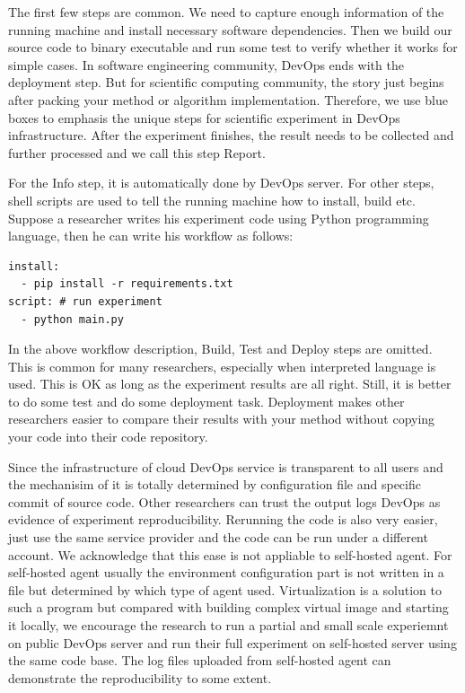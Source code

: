 \documentclass{IEEEcsmag}
\begin{document}
The first few steps are common. We need to capture enough information of the running machine and install necessary software dependencies. Then we build our source code to binary executable and run some test to verify whether it works for simple cases. In software engineering community, DevOps ends with the deployment step. But for scientific computing community, the story just begins after packing your method or algorithm implementation. Therefore, we use blue boxes to emphasis the unique steps for scientific experiment in DevOps infrastructure. After the experiment finishes, the result needs to be collected and further processed and we call this step Report.

For the Info step, it is automatically done by DevOps server. For other steps, shell scripts are used to tell the running machine how to install, build etc. Suppose a researcher writes his experiment code using Python programming language, then he can write his workflow as follows:
\begin{lstlisting}
install: 
  - pip install -r requirements.txt
script: # run experiment
  - python main.py
\end{lstlisting}

In the above workflow description, Build, Test and Deploy steps are omitted. This is common for many researchers, especially when interpreted language is used. This is OK as long as the experiment results are all right. Still, it is better to do some test and do some deployment task. Deployment makes other researchers easier to compare their results with your method without copying your code into their code repository.

Since the infrastructure of cloud DevOps service is transparent to all users and the mechanisim of it is totally determined by configuration file and specific commit of source code. Other researchers can trust the output logs DevOps as evidence of experiment reproducibility. Rerunning the code is also very easier, just use the same service provider and the code can be run under a different account. We acknowledge that this ease is not appliable to self-hosted agent. For self-hosted agent usually the environment configuration part is not written in a file but determined by which type of agent used. Virtualization is a solution to such a program but compared with building complex virtual image and starting it locally, we encourage the research to run a partial and small scale experiemnt on public DevOps server and run their full experiment on self-hosted server using the same code base. The log files uploaded from self-hosted agent can demonstrate the reproducibility to some extent.
\end{document}
